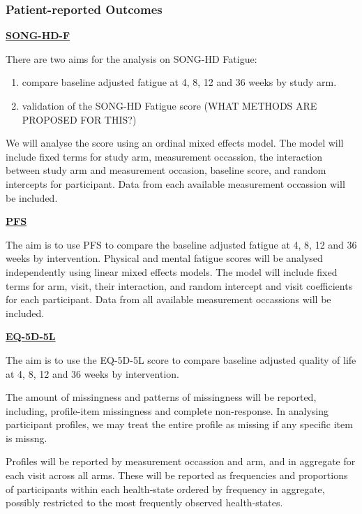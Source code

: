 \documentclass[11pt,parskip=half-]{scrartcl}
\providecommand{\tightlist}{%
  \setlength{\itemsep}{0pt}\setlength{\parskip}{0pt}}
\begin{document}
\subsubsection{Patient-reported Outcomes}\label{patient-reported-outcomes}

\label{analysis:song-hd-f}
\hyperref[outcome:song-hd-f]{\textbf{SONG-HD-F}}

There are two aims for the analysis on SONG-HD Fatigue:

\begin{enumerate}
  \tightlist
  \item compare baseline adjusted fatigue at 4, 8, 12 and 36 weeks by study arm.
  \item validation of the SONG-HD Fatigue score (WHAT METHODS ARE PROPOSED FOR THIS?)
\end{enumerate}

We will analyse the score using an ordinal mixed effects model. The model will include fixed terms for study arm, measurement occassion, the interaction between study arm and measurement occasion, baseline score, and random intercepts for participant. Data from each available measurement occassion will be included.

\label{analysis:pfs}
\hyperref[outcome:pfs]{\textbf{PFS}}

The aim is to use PFS to compare the baseline adjusted fatigue at 4, 8, 12 and 36 weeks by intervention. Physical and mental fatigue scores will be analysed independently using linear mixed effects models. The model will include fixed terms for arm, visit, their interaction, and random intercept and visit coefficients for each participant. Data from all available measurement occassions will be included.


\label{analysis:eq5d5l}
\hyperref[outcome:eq5d5l]{\textbf{EQ-5D-5L}}

The aim is to use the EQ-5D-5L score to compare baseline adjusted quality of life at 4, 8, 12 and 36 weeks by intervention.

The amount of missingness and patterns of missingness will be reported, including, profile-item missingness and complete non-response. In analysing participant profiles, we may treat the entire profile as missing if any specific item is missng.

Profiles will be reported by measurement occassion and arm, and in aggregate for each visit across all arms. These will be reported as frequencies and proportions of participants within each health-state ordered by frequency in aggregate, possibly restricted to the most frequently observed health-states.
\end{document}

